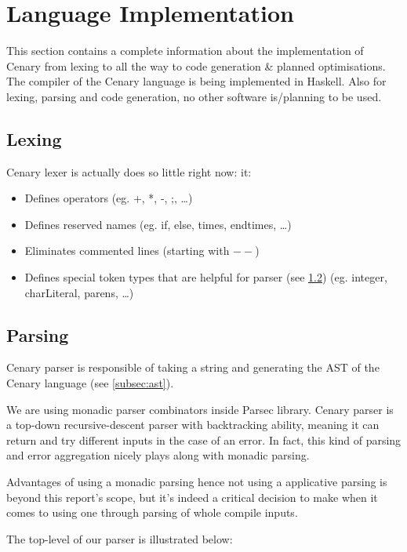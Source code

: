 \documentclass{article}
\begin{document}
\section{Language Implementation}
This section contains a complete information about the implementation of Cenary from lexing to all the way to code generation \& planned optimisations.
The compiler of the Cenary language is being implemented in Haskell. Also for lexing, parsing and code generation, no other software is/planning to be used.
\subsection{Lexing}
\label{subsec:lexing}
Cenary lexer is actually does so little right now: it:
\begin{itemize}
  \item Defines operators (eg. +, *, -, ;, \ldots)
  \item Defines reserved names (eg. if, else, times, endtimes, \ldots)
  \item Eliminates commented lines (starting with $--$)
  \item Defines special token types that are helpful for parser (see \ref{subsec:parsing}) (eg. integer, charLiteral, parens, \ldots)
\end{itemize}
\subsection{Parsing}
\label{subsec:parsing}
Cenary parser is responsible of taking a string and generating the AST of the Cenary language (see \ref{subsec:ast}).
\par We are using monadic parser combinators inside Parsec library. Cenary parser is a top-down recursive-descent parser with backtracking ability, meaning it can return and try different inputs in the case of an error. In fact, this kind of parsing and error aggregation nicely plays along with monadic parsing.
\par Advantages of using a monadic parsing hence not using a applicative parsing is beyond this report's scope, but it's indeed a critical decision to make when it comes to using one through parsing of whole compile inputs.
\par The top-level of our parser is illustrated below:

\end{document}
